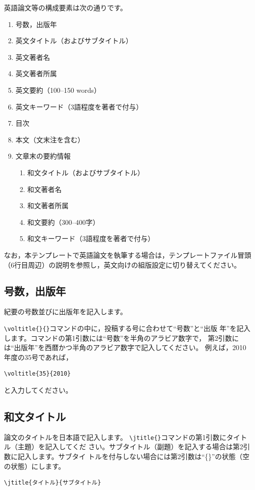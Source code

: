 \documentclass[b5paper,10pt,twocolumn,tombow]{jarticle}
\begin{document}
英語論文等の構成要素は次の通りです。
\begin{enumerate}
  \item 号数，出版年
  \item 英文タイトル（およびサブタイトル）
  \item 英文著者名
  \item 英文著者所属
  \item 英文要約（100--150 words）
  \item 英文キーワード（3語程度を著者で付与）
  \item 目次
  \item 本文（文末注を含む）
  \item 文章末の要約情報
  \begin{enumerate}
    \item 和文タイトル（およびサブタイトル）
    \item 和文著者名
    \item 和文著者所属
    \item 和文要約（300--400字）
    \item 和文キーワード（3語程度を著者で付与）
  \end{enumerate}
\end{enumerate}
なお，本テンプレートで英語論文を執筆する場合は，テンプレートファイル冒頭（6行目周辺）の説明を参照し，英文向けの組版設定に切り替えてください。

\subsection{号数，出版年}
紀要の号数並びに出版年を記入します。

\verb|\voltitle{}{}|コマンドの中に，投稿する号に合わせて``号数''と``出版
年''を記入します。コマンドの第1引数には``号数''を半角のアラビア数字で，
第2引数には``出版年''を西暦かつ半角のアラビア数字で記入してください。
例えば，2010年度の35号であれば，
\begin{verbatim}
\voltitle{35}{2010}
\end{verbatim}
と入力してください。

\subsection{和文タイトル}
論文のタイトルを日本語で記入します。
\verb|\jtitle{}|コマンドの第1引数にタイトル（主題）を記入してくだ
さい。サブタイトル（副題）を記入する場合は第2引数に記入します。サブタイ
トルを付与しない場合には第2引数は``\{\}''の状態（空の状態）にします。
\begin{verbatim}
\jtitle{タイトル}{サブタイトル}
\end{verbatim}
\end{document}
